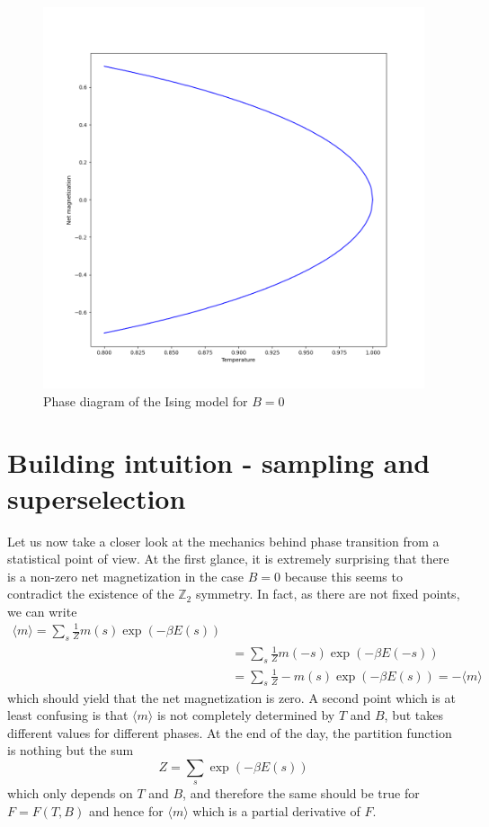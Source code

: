 \documentclass[a4paper, draft]{article}
\theoremstyle{own}
\theoremstyle{remark}
\newcommand{\Z}{\mathbb{Z}}
\begin{document}
\begin{figure}[ht]
	\centering
	\includegraphics[scale=.5]{IsingModelCriticalTemperature	}
	\caption{Phase diagram of the Ising model for $B = 0$}
	\label{fig:IsingModelCritical}
\end{figure}


\section{Building intuition - sampling and superselection}

Let us now take a closer look at the mechanics behind phase transition from a statistical point of view. At the first glance, it is extremely surprising that there is a non-zero net magnetization in the case $B = 0$ because this seems to contradict the existence of the $\Z_2$ symmetry. In fact, as there are not fixed points, we can write
\begin{align*}
\langle m \rangle = \sum_{s} \frac{1}{Z} m(s) \exp(-\beta E(s)) \\
&= \sum_{s} \frac{1}{Z} m(-s) \exp(-\beta E(-s)) \\ 
&= \sum_{s} \frac{1}{Z} - m(s) \exp(-\beta E(s)) = - \langle m \rangle
\end{align*}
which should yield that the net magnetization is zero.  A second point which is at least confusing is that $\langle m \rangle $ is not completely determined by $T$ and $B$, but takes different values for different phases. At the end of the day, the partition function is nothing but the sum
$$
Z = \sum_s \exp(-\beta E(s))
$$
which only depends on $T$ and $B$, and therefore the same should be true for $F = F(T, B)$ and hence for $\langle m \rangle$ which is a partial derivative of $F$.
\end{document}
